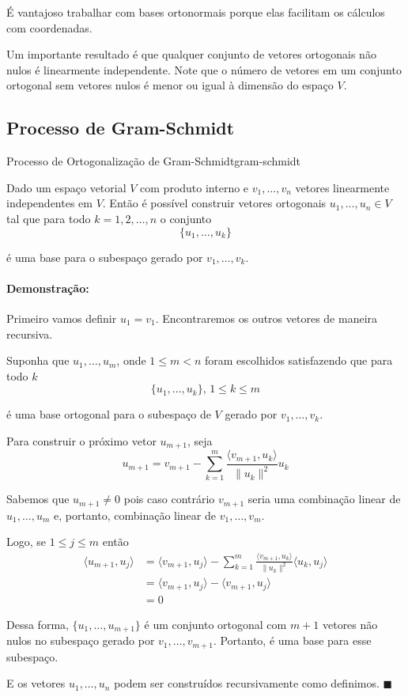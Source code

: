 \documentclass[12pt,a4paper]{article}
\newenvironment{proof}{\paragraph{Demonstração:}}{\hfill$\blacksquare$}
\begin{document}
É vantajoso trabalhar com bases ortonormais porque elas facilitam os cálculos com coordenadas.

Um importante resultado é que qualquer conjunto de vetores ortogonais não nulos é linearmente independente. Note que o número de vetores em um conjunto ortogonal sem vetores nulos é menor ou igual à dimensão do espaço $V$.

\subsection{Processo de Gram-Schmidt}

\begin{teorema}{Processo de Ortogonalização de Gram-Schmidt}{gram-schmidt}

Dado um espaço vetorial $V$ com produto interno e $v_1, \ldots, v_n$ vetores linearmente independentes em $V$. Então é possível construir vetores ortogonais $u_1, \ldots, u_n \in V$ tal que para todo $k = 1, 2, \ldots, n$ o conjunto
\[
\{ u_1, \ldots, u_k \}
\]

é uma base para o subespaço gerado por $v_1, \ldots, v_k$.
\end{teorema}
\begin{proof}
Primeiro vamos definir $u_1 = v_1$. Encontraremos os outros vetores de maneira recursiva.

Suponha que $u_1, \ldots, u_m$, onde $1 \leq m < n$ foram escolhidos satisfazendo que para todo $k$
\[
\{ u_1, \ldots, u_k \}, \, 1 \leq k \leq m
\]

é uma base ortogonal para o subespaço de $V$ gerado por $v_1, \ldots, v_k$.

Para construir o próximo vetor $u_{m+1}$, seja
\[
u_{m+1} = v_{m+1} - \sum_{k=1}^m \frac{\langle v_{m+1}, u_k \rangle}{\| u_k \|^2}u_k
\]

Sabemos que $u_{m+1} \neq 0$ pois caso contrário $v_{m+1}$ seria uma combinação linear de $u_1, \ldots, u_m$ e, portanto, combinação linear de $v_1, \ldots, v_m$.

Logo, se $1 \leq j \leq m$ então
\begin{equation*}
\begin{split}
\langle u_{m+1},u_j \rangle &= \langle v_{m+1},u_j \rangle - \sum_{k=1}^m \frac{\langle v_{m+1},u_k \rangle}{\| u_k \|^2} \langle u_k,u_j \rangle \\
&= \langle v_{m+1},u_j \rangle - \langle v_{m+1},u_j \rangle \\
&= 0
\end{split}
\end{equation*}

Dessa forma, $\{ u_1, \ldots, u_{m+1}\}$ é um conjunto ortogonal com $m+1$ vetores não nulos no subespaço gerado por $v_1, \ldots, v_{m+1}$. Portanto, é uma base para esse subespaço.

E os vetores $u_1, \ldots, u_n$ podem ser construídos recursivamente como definimos.
\end{proof} 
\end{document}
